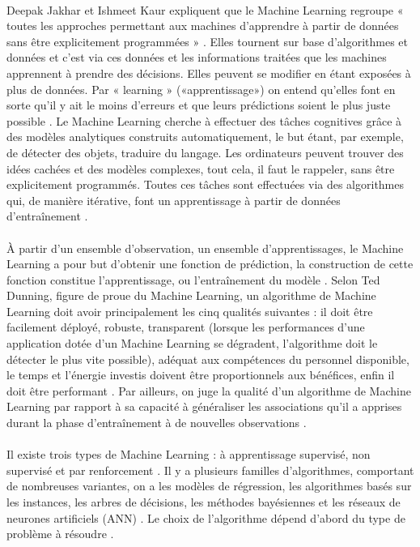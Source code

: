 \documentclass{article}
\begin{document}
\paragraph{}
Deepak Jakhar et Ishmeet Kaur expliquent que le Machine Learning regroupe « toutes les approches permettant aux machines d’apprendre à partir de données sans être explicitement programmées » \cite[p. 132]{jakhar2020artificial}. Elles tournent sur base d’algorithmes et données et c’est via ces données et les informations traitées que les machines apprennent à prendre des décisions. Elles peuvent se modifier en étant exposées à plus de données. Par « learning » («apprentissage») on entend qu’elles font en sorte qu’il y ait le moins d’erreurs et que leurs prédictions soient le plus juste possible \cite[p. 132]{jakhar2020artificial}. Le Machine Learning cherche à effectuer des tâches cognitives grâce à des modèles analytiques construits automatiquement, le but étant, par exemple, de détecter des objets, traduire du langage. Les ordinateurs peuvent trouver des idées cachées et des modèles complexes, tout cela, il faut le rappeler, sans être explicitement programmés. Toutes ces tâches sont effectuées via des algorithmes qui, de manière itérative, font un apprentissage à partir de données d’entraînement \cite[p. 686]{janiesch2021machine}. 
\paragraph{}
À partir d’un ensemble d’observation, un ensemble d’apprentissages, le Machine Learning a pour but d’obtenir une fonction de prédiction, la construction de cette fonction constitue l’apprentissage, ou l’entraînement du modèle \cite[p. 115]{lemberger2019big}. Selon Ted Dunning, figure de proue du Machine Learning, un algorithme de Machine Learning doit avoir principalement les cinq qualités suivantes : il doit être facilement déployé, robuste, transparent (lorsque les performances d’une application dotée d’un Machine Learning se dégradent, l’algorithme doit le détecter le plus vite possible), adéquat aux compétences du personnel disponible, le temps et l'énergie investis doivent être proportionnels aux bénéfices, enfin il doit être performant \cite[pp. 117-118]{lemberger2019big}. Par ailleurs, on juge la qualité d’un algorithme de Machine Learning par rapport à sa capacité à généraliser les associations qu’il a apprises durant la phase d’entraînement à de nouvelles observations \cite[p. 118]{lemberger2019big}. 
\paragraph{}
Il existe trois types de Machine Learning : à apprentissage supervisé, non supervisé et par renforcement \cite[p. 686]{janiesch2021machine}. Il y a plusieurs familles d’algorithmes, comportant de nombreuses variantes, on a les modèles de régression, les algorithmes basés sur les instances, les arbres de décisions, les méthodes bayésiennes et les réseaux de neurones artificiels (ANN) \cite[p. 687]{janiesch2021machine}. Le choix de l’algorithme dépend d’abord du type de problème à résoudre \cite[p. 122]{lemberger2019big}.
\end{document}
